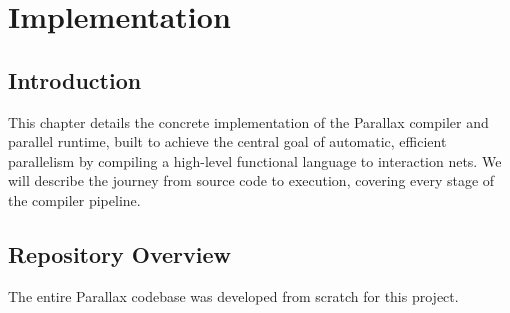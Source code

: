 \chapter{Implementation}

\section{Introduction}
This chapter details the concrete implementation of the Parallax compiler and parallel runtime, built to achieve the central goal of automatic, efficient parallelism by compiling a high-level functional language to interaction nets. We will describe the journey from source code to execution, covering every stage of the compiler pipeline.

\section{Repository Overview}
The entire Parallax codebase was developed from scratch for this project.

